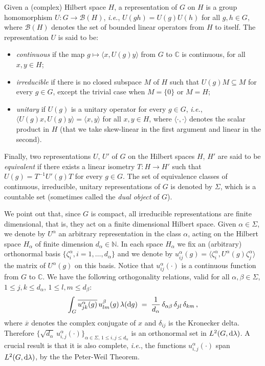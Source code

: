 \documentclass[a4paper,reqno,11pt]{amsart}
\numberwithin{equation}{section}
\newcommand{\cB}{{\ensuremath{\mathcal B}} }
\newcommand{\ga}{\alpha}
\newcommand{\gb}{\beta}
\newcommand{\dd}{\text{\rm d}}             %
\newcommand{\C}{\mathbb{C}}
\newcommand{\N}{\mathbb{N}}
\begin{document}
Given a (complex) Hilbert space $H$, a representation of $G$ on $H$ is a
group homomorphism $U:G \to \cB(H)$, {\sl i.e.}, $U(gh) = U(g)U(h)$ for all $g,h \in G$,
where $\cB(H)$ denotes the set of bounded linear operators
from $H$ to itself. The representation $U$ is said to be:
\begin{itemize}
\item {\sl continuous} if the map $g \mapsto \langle x, U(g) y \rangle$
from $G$ to $\C$ is continuous, for all $x,y \in H$;
\item {\sl irreducible} if there is no closed subspace $M$ of $H$ such that
$U(g) M \subseteq M$ for every $g \in G$,
except the trivial case when $M=\{0\}$ or $M=H$;
\item {\sl unitary} if $U(g)$ is a unitary operator for every $g \in G$, {\sl i.e.},
$\langle U(g) x, U(g) y \rangle = \langle x,y \rangle$ for all $x,y \in H$, where
$\langle\cdot,\cdot\rangle$ denotes the scalar product in $H$ (that we
take skew-linear in the first argument and linear in the second).
\end{itemize}
Finally, two representations $U$, $U'$ of $G$ on the Hilbert spaces $H$, $H'$
are said to be {\sl equivalent} if there exists a linear isometry $T: H \to H'$
such that $U(g) = T^{-1} U'(g) T$ for every $g \in G$.
The set of equivalence classes of continuous, irreducible, unitary representations
of $G$ is denoted by $\Sigma$, which is a countable
set (sometimes called the {\sl dual object} of $G$).


We point out that, since $G$ is compact, all irreducible representations are
finite dimensional, that is, they act on a finite dimensional Hilbert space.
Given $\alpha \in \Sigma$, we denote by $U^\alpha$
an arbitrary representation in the class $\alpha$, acting on the Hilbert space $H_\alpha$
of finite dimension $d_\alpha \in \N$.
In each space $H_\alpha$ we fix an (arbitrary) orthonormal basis
$\{\zeta^\alpha_i, i=1,\dots,d_\alpha\}$ and we denote by
$u^{\alpha}_{ij}(g) = \langle \zeta^\alpha_i, U^\alpha(g) \zeta_j^\alpha \rangle$
the matrix of $U^\alpha(g)$ on this basis.
Notice that $u^{\alpha}_{ij}(\cdot)$ is a continuous function from $G$ to $\C$.
We have the following orthogonality relations, valid for all
$\ga,\beta \in \Sigma$, $1 \le j,k \le d_{\alpha}$, $1 \le l,m \le d_{\beta}$:
\begin{equation}
  \label{eq:ortho-coeffs}
\int_G \overline{u^\alpha_{jk}(g)} \, u^\beta_{lm}(g) \, \lambda(\dd g) \;=\;
\frac {1}{d_\alpha} \, \delta_{\ga \gb} \, \delta_{jl} \, \delta_{km} \,,
\end{equation}
where $\overline{x}$ denotes the complex conjugate of $x$ and $\delta_{ij}$
is the Kronecker delta.
Therefore $\{\sqrt{d_\alpha} \, u^\alpha_{i,j}(\cdot)\}_{\alpha \in \Sigma,\,
1 \le i,j \le d_\alpha}$ is an orthonormal set in $L^2(G, \dd\lambda)$.
A crucial result is that it is also complete, {\sl i.e.},
the functions $u^\ga_{i,j}(\cdot)$ span $L^2(G, \dd\lambda)$,
by the the Peter-Weil Theorem.
\end{document}

